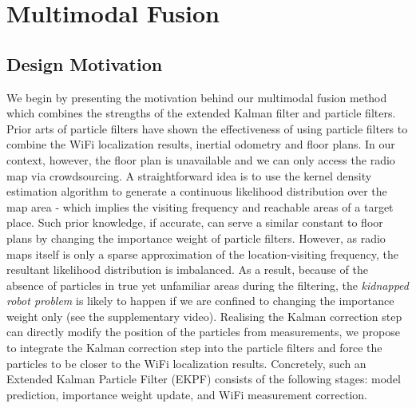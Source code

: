\section{Multimodal Fusion}
\label{sec:multimodal_fusion}

\subsection{Design Motivation}
We begin by presenting the motivation behind our multimodal fusion method which combines the strengths of the extended Kalman filter and particle filters. Prior arts of particle filters have shown the effectiveness of using particle filters to combine the WiFi localization results, inertial odometry and floor plans. In our context, however, the floor plan is unavailable and we can only access the radio map via crowdsourcing. A straightforward idea is to use the kernel density estimation algorithm\cite{silverman2018density} to generate a continuous likelihood distribution over the map area - which implies the visiting frequency and reachable areas of a target place. Such prior knowledge, if accurate, can serve a similar constant to floor plans by changing the importance weight of particle filters. However, as radio maps itself is only a sparse approximation of the location-visiting frequency, the resultant likelihood distribution is imbalanced. As a result, because of the absence of particles in true yet unfamiliar areas during the filtering, the \emph{kidnapped robot problem} \cite{Thrun2005Probabilistic,hester2008negative} is likely to happen if we are confined to changing the importance weight only (see the supplementary video). Realising the Kalman correction step can directly modify the position of the particles from measurements, we propose to integrate the Kalman correction step into the particle filters and force the particles to be closer to the WiFi localization results. Concretely, such an Extended Kalman Particle Filter (EKPF) consists of the following stages: model prediction, importance weight update, and WiFi measurement correction.  

